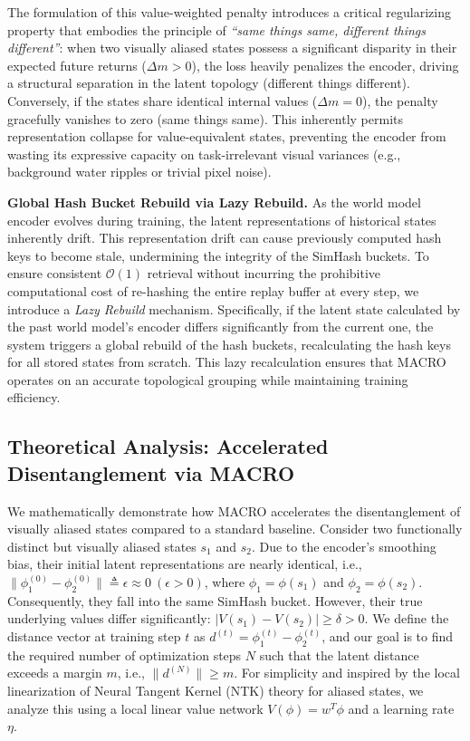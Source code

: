 \documentclass{article} %
\begin{document}
The formulation of this value-weighted penalty introduces a critical regularizing property that embodies the principle of \textit{``same things same, different things different''}: when two visually aliased states possess a significant disparity in their expected future returns ($\Delta m > 0$), the loss heavily penalizes the encoder, driving a structural separation in the latent topology (different things different). Conversely, if the states share identical internal values ($\Delta m = 0$), the penalty gracefully vanishes to zero (same things same). This inherently permits representation collapse for value-equivalent states, preventing the encoder from wasting its expressive capacity on task-irrelevant visual variances (e.g., background water ripples or trivial pixel noise).

\textbf{Global Hash Bucket Rebuild via Lazy Rebuild.}
As the world model encoder evolves during training, the latent representations of historical states inherently drift. This representation drift can cause previously computed hash keys to become stale, undermining the integrity of the SimHash buckets. To ensure consistent $\mathcal{O}(1)$ retrieval without incurring the prohibitive computational cost of re-hashing the entire replay buffer at every step, we introduce a \textit{Lazy Rebuild} mechanism. Specifically, if the latent state calculated by the past world model's encoder differs significantly from the current one, the system triggers a global rebuild of the hash buckets, recalculating the hash keys for all stored states from scratch. This lazy recalculation ensures that MACRO operates on an accurate topological grouping while maintaining training efficiency.

\subsection{Theoretical Analysis: Accelerated Disentanglement via MACRO}

We mathematically demonstrate how MACRO accelerates the disentanglement of visually aliased states compared to a standard baseline. Consider two functionally distinct but visually aliased states $s_1$ and $s_2$. Due to the encoder's smoothing bias, their initial latent representations are nearly identical, i.e., $\|\phi_1^{(0)} - \phi_2^{(0)}\| \triangleq \epsilon \approx 0 \ (\epsilon > 0)$, where $\phi_1 = \phi(s_1)$ and $\phi_2 = \phi(s_2)$. Consequently, they fall into the same SimHash bucket. However, their true underlying values differ significantly: $|V(s_1) - V(s_2)| \ge \delta > 0$. We define the distance vector at training step $t$ as $d^{(t)} = \phi_1^{(t)} - \phi_2^{(t)}$, and our goal is to find the required number of optimization steps $N$ such that the latent distance exceeds a margin $m$, i.e., $\|d^{(N)}\| \ge m$. For simplicity and inspired by the local linearization of Neural Tangent Kernel (NTK) theory for aliased states, we analyze this using a local linear value network $V(\phi) = w^T\phi$ and a learning rate $\eta$.
\end{document}
